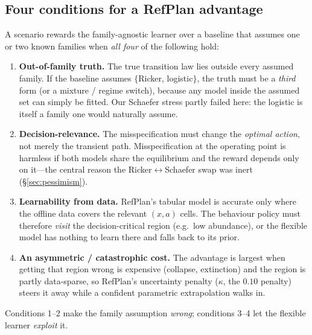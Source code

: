 \documentclass[11pt]{article}
\begin{document}
\subsection{Four conditions for a RefPlan advantage}
A scenario rewards the family-agnostic learner over a baseline that assumes one or
two known families when \emph{all four} of the following hold:
\begin{enumerate}
  \item \textbf{Out-of-family truth.} The true transition law lies outside every
  assumed family. If the baseline assumes $\{$Ricker, logistic$\}$, the truth must
  be a \emph{third} form (or a mixture / regime switch), because any model inside
  the assumed set can simply be fitted. Our Schaefer stress partly failed here:
  the logistic is itself a family one would naturally assume.
  \item \textbf{Decision-relevance.} The misspecification must change the
  \emph{optimal action}, not merely the transient path. Misspecification at the
  operating point is harmless if both models share the equilibrium and the reward
  depends only on it---the central reason the Ricker$\leftrightarrow$Schaefer swap
  was inert (\S\ref{sec:pessimism}).
  \item \textbf{Learnability from data.} RefPlan's tabular model is accurate only
  where the offline data covers the relevant $(x,a)$ cells. The behaviour policy
  must therefore \emph{visit} the decision-critical region (e.g.\ low abundance),
  or the flexible model has nothing to learn there and falls back to its prior.
  \item \textbf{An asymmetric / catastrophic cost.} The advantage is largest when
  getting that region wrong is expensive (collapse, extinction) and the region is
  partly data-sparse, so RefPlan's uncertainty penalty ($\kappa$, the $0.10$
  penalty) steers it away while a confident parametric extrapolation walks in.
\end{enumerate}
Conditions 1--2 make the family assumption \emph{wrong}; conditions 3--4 let the
flexible learner \emph{exploit} it.
\end{document}
